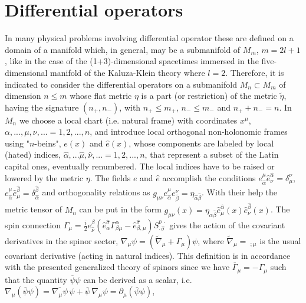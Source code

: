 \documentclass[a4paper,12pt]{article}
\begin{document}
\section{Differential operators}

In many physical problems involving  differential operator these are defined 
on a domain of a manifold  which, in general, may be a submanifold of 
$M_{m}$, $m=2l+1$, like in the case of the (1+3)-dimensional spacetimes 
immersed in 
the five-dimensional manifold of the Kaluza-Klein theory where $l=2$. 
Therefore, it is indicated to consider the differential operators on a 
submanifold $M_{n}\subset  M_{m}$  of dimension $n\le m$ whose flat 
metric $\eta$ is a part (or restriction) of the metric $\tilde\eta$, having the
signature $(n_{+},n_{-})$, with $n_{+}\le  m_{+}$,  $n_{-}\le  m_{-}$ and  
$n_{+}+n_{-}=n$. In $M_{n}$ we choose  a local chart (i.e. natural frame) 
with coordinates $x^{\mu}$, $\alpha,...,\mu,\nu,...=1,2,...,n$, and introduce 
local orthogonal non-holonomic frames using "$n$-beins", $e(x)$ and 
$\hat e(x)$, whose components are labeled by local (hated) indices, 
$\hat\alpha,...\hat\mu,\hat\nu,...=1,2,...,n$, that represent a subset of the  
Latin capital ones, eventually renumbered. The local indices have to be raised 
or lowered by the metric $\eta$. The fields $e$ and $\hat e$ accomplish the 
conditions   
$e_{\hat\alpha}^{\mu}\hat e_{\nu}^{\hat\alpha}=\delta_{\mu}^{\nu}$,
$e_{\hat\alpha}^{\mu}\hat e_{\mu}^{\hat\beta}=\delta_{\hat\alpha}^{\hat\beta}$ 
and  orthogonality relations as 
$g_{\mu\nu} e_{\hat\alpha}^{\mu} e^{\nu}_{\hat\beta}=
\eta_{\hat\alpha \hat\beta}$. With their help   
the metric tensor of $M_n$ can be put in the form   
$g_{\mu\nu}(x)=\eta_{\hat\alpha \hat\beta}
\hat e ^{\hat\alpha}_{\mu}(x) \hat e^{\hat\beta}_{\nu}(x)$.    
The spin connection 
$\Gamma_{\mu}=\frac{i}{2}
e^{\beta}_{\hat\nu}
(\hat e^{\hat\sigma}_{\alpha}\Gamma^{\alpha}_{\beta\mu}-
\hat e^{\hat\sigma}_{\beta,\mu} )
S^{\hat\nu\,\cdot}_{\cdot\,\hat\sigma}$
gives the action of the covariant derivatives in the spinor sector,  
$\nabla_{\mu}\psi=(\tilde\nabla_{\mu}+\Gamma_{\mu})\psi$, where 
$\tilde\nabla_{\mu}=~_{;\mu}$ is the usual covariant derivative (acting in 
natural indices). This definition is 
in accordance with the presented generalized theory of spinors since we have 
$\overline{\Gamma}_{\mu}=-\Gamma_{\mu}$ such that 
the quantity $\overline{\psi}\psi$ can be derived as 
a scalar, i.e. 
$\nabla_{\mu}(\overline{\psi}\psi)=
\overline{\nabla_{\mu}\psi}\,\psi+\overline{\psi}\,\nabla_{\mu}\psi=
\partial_{\mu}(\overline{\psi}\psi)$,
\end{document}

